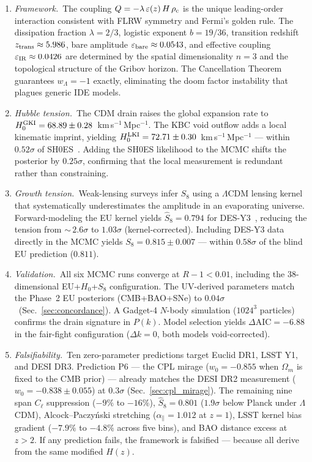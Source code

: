 \documentclass[a4paper,fleqn]{cas-dc}
\newcommand{\rhoc}{\rho_{\rm c}}
\begin{document}
\begin{enumerate}

\item \textit{Framework.}~The coupling
$Q = -\lambda\,\varepsilon(z)\,H\,\rhoc$ is the unique
leading-order interaction consistent with FLRW symmetry
and Fermi's golden rule. The dissipation fraction
$\lambda = 2/3$, logistic exponent $b = 19/36$, transition
redshift $z_{\rm trans} \approx 5.986$, bare amplitude
$\varepsilon_{\rm bare} \approx 0.0543$, and effective
coupling $\varepsilon_{\rm IR} \approx 0.0426$ are
determined by the spatial dimensionality $n = 3$ and the
topological structure of the Gribov horizon. The
Cancellation Theorem guarantees $w_\Lambda = -1$ exactly,
eliminating the doom factor instability that plagues
generic IDE models.

\item \textit{Hubble tension.}~The CDM drain raises the
global expansion rate to
$H_0^{\rm GKI} = 68.89 \pm 0.28$~km\,s$^{-1}$\,Mpc$^{-1}$.
The KBC void outflow adds a local kinematic imprint,
yielding
$H_0^{\rm LKI} = 72.71 \pm 0.30$~km\,s$^{-1}$\,Mpc$^{-1}$
--- within $0.52\sigma$ of
SH0ES~\cite{breuval2024}. Adding the SH0ES likelihood
to the MCMC shifts the posterior by $0.25\sigma$,
confirming that the local measurement is redundant
rather than constraining.

\item \textit{Growth tension.}~Weak-lensing surveys
infer $S_8$ using a $\Lambda$CDM lensing kernel that
systematically underestimates the amplitude in an
evaporating universe. Forward-modeling the EU kernel
yields $\hat{S}_8 = 0.794$ for
DES-Y3~\cite{des2022}, reducing the tension from
${\sim}\,2.6\sigma$ to $1.03\sigma$ (kernel-corrected).
Including DES-Y3 data directly in the MCMC yields
$S_8 = 0.815 \pm 0.007$ --- within $0.58\sigma$ of the
blind EU prediction ($0.811$).

\item \textit{Validation.}~All six MCMC runs converge at
$R-1 < 0.01$, including the 38-dimensional
EU+$H_0$+$S_8$ configuration. The UV-derived
parameters match the Phase~2 EU posteriors (CMB+BAO+SNe)
to $0.04\sigma$~(Sec.~\ref{sec:concordance}).
A Gadget-4 $N$-body simulation ($1024^3$ particles)
confirms the drain signature in $P(k)$.
Model selection yields
$\Delta\text{AIC} = -6.88$ in the fair-fight
configuration ($\Delta k = 0$, both models
void-corrected).

\item \textit{Falsifiability.}~Ten zero-parameter
predictions target Euclid DR1, LSST Y1, and DESI DR3.
Prediction P6 --- the CPL mirage
($w_0 = -0.855$ when $\Omega_m$ is fixed to the CMB
prior) --- already matches the DESI DR2 measurement
($w_0 = -0.838 \pm 0.055$) at $0.3\sigma$
(Sec.~\ref{sec:cpl_mirage}). The remaining nine span
$C_\ell$ suppression ($-9\%$ to $-16\%$),
$\hat{S}_8 = 0.801$ ($1.9\sigma$ below Planck under
$\Lambda$CDM),
Alcock--Paczy\'nski stretching
($\alpha_\parallel = 1.012$ at $z = 1$),
LSST kernel bias gradient
($-7.9\%$ to $-4.8\%$ across five bins), and
BAO distance excess at $z > 2$.
If any prediction fails, the framework is
falsified --- because all derive from the same
modified $H(z)$.

\end{enumerate}
\end{document}
